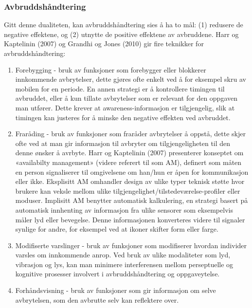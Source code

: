 \subsubsection{Avbruddshåndtering}
Gitt denne dualiteten, kan avbruddshåndtering sies å ha to mål: (1) redusere de negative effektene, og (2) utnytte de positive effektene av avbruddene. Harr og Kaptelinin (2007) og Grandhi og Jones (2010) gir fire teknikker for avbruddshåndtering:
\begin{enumerate}        
\item Forebygging - bruk av funksjoner som forebygger eller blokkerer innkommende avbrytelser, dette gjøres ofte enkelt ved å for eksempel skru av mobilen for en periode. En annen strategi er å kontrollere timingen til avbruddet, eller å kun tillate avbrytelser som er relevant for den oppgaven man utfører. Dette krever at awareness-informasjon er tilgjengelig, slik at timingen kan justeres for å minske den negative effekten ved avbruddet.

\item Fraråding - bruk av funksjoner som fraråder avbrytelser å oppstå, dette skjer ofte ved at man gir informasjon til avbryter om tilgjengeligheten til den denne ønsker å avrbyte. Harr og Kaptelinin (2007) presenterer konseptet om «availabilty management» (videre referert til som AM), definert som måten en person signaliserer til omgivelsene om han/hun er åpen for kommunikasjon eller ikke.
\noindent
Eksplisitt AM omhandler design av ulike typer teknisk støtte hvor brukere kan veksle mellom ulike tilgjengelighet/tilstedeværelse-profiler eller moduser. Implisitt AM benytter automatisk kalkulering, en strategi basert på automatisk innhenting  av informasjon fra ulike sensorer som eksempelvis måler lyd eller bevegelse. Denne informasjonen konverteres videre til signaler synlige for andre, for eksempel ved at ikoner skifter form eller farge.  

\item Modifiserte varslinger - bruk av funksjoner som modifiserer hvordan individer varsles om innkommende anrop. Ved bruk av ulike modaliteter som lyd, vibrasjon og lys, kan man minimere interferensen mellom perseptuelle og kognitive prosesser involvert i avbruddshåndtering og oppgaveytelse.

\item Forhåndsvisning - bruk av funksjoner som gir informasjon om selve avbrytelsen, som den avbrutte selv kan reflektere over.   
\end{enumerate}


